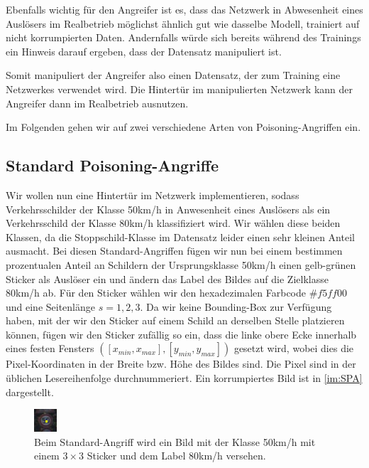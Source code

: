 \documentclass[11pt,a4paper]{article}
\numberwithin{equation}{section}
\begin{document}
	Ebenfalls wichtig für den Angreifer ist es, dass das Netzwerk in Abwesenheit eines Auslösers im Realbetrieb möglichst ähnlich gut wie dasselbe Modell, trainiert auf nicht korrumpierten Daten. Andernfalls würde sich bereits während des Trainings ein Hinweis darauf ergeben, dass der Datensatz manipuliert ist.
	
	Somit manipuliert der Angreifer also einen Datensatz, der zum Training eine Netzwerkes verwendet wird. Die Hintertür im manipulierten Netzwerk kann der Angreifer dann im Realbetrieb ausnutzen.
	
	Im Folgenden gehen wir auf zwei verschiedene Arten von Poisoning-Angriffen ein.
	
	
	\subsection{Standard Poisoning-Angriffe}
	Wir wollen nun eine Hintertür im Netzwerk implementieren, sodass Verkehrsschilder der Klasse 50km/h in Anwesenheit eines Auslösers als ein Verkehrsschild der Klasse 80km/h klassifiziert wird. Wir wählen diese beiden Klassen, da die Stoppschild-Klasse im Datensatz leider einen sehr kleinen Anteil ausmacht. 
	Bei diesen Standard-Angriffen fügen wir nun bei einem bestimmen prozentualen Anteil an Schildern der Ursprungsklasse 50km/h einen gelb-grünen Sticker als Auslöser ein und ändern das Label des Bildes auf die Zielklasse 80km/h ab. Für den Sticker wählen wir den hexadezimalen Farbcode $\#f5ff00$ und eine Seitenlänge $s=1,2,3$.
	Da wir keine Bounding-Box zur Verfügung haben, mit der wir den Sticker auf einem Schild an derselben Stelle platzieren können, fügen wir den Sticker zufällig so ein, dass die linke obere Ecke innerhalb eines festen Fensters $([x_{min},x_{max}], [y_{min},y_{max}])$ gesetzt wird, wobei dies die Pixel-Koordinaten in der Breite bzw. Höhe des Bildes sind. Die Pixel sind in der üblichen Lesereihenfolge durchnummeriert. Ein korrumpiertes Bild ist in \autoref{im:SPA} dargestellt.
	
	\begin{figure}
		
			\centering
			\includegraphics[width=.2\linewidth]{1450_poison}
	
		\caption[Mit einem Auslöser versehenes Bild.]{Beim Standard-Angriff wird ein Bild mit der Klasse 50km/h mit einem $3\times 3$ Sticker und dem Label 80km/h versehen.}		
		\label{im:SPA}
	\end{figure}
\end{document}

